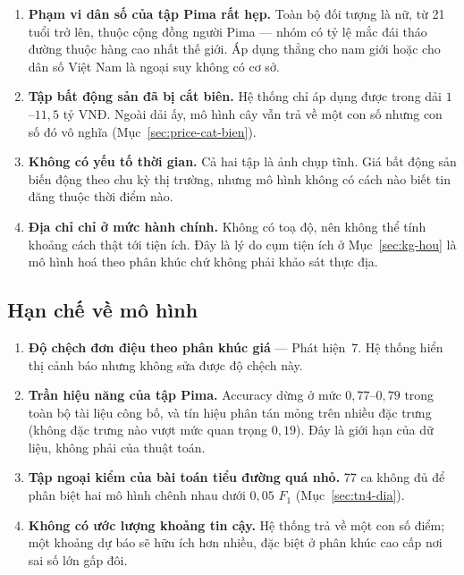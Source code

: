 \begin{enumerate}
  \item \textbf{Phạm vi dân số của tập Pima rất hẹp.} Toàn bộ đối tượng là nữ,
        từ 21 tuổi trở lên, thuộc cộng đồng người Pima --- nhóm có tỷ lệ mắc đái
        tháo đường thuộc hàng cao nhất thế giới. Áp dụng thẳng cho nam giới hoặc
        cho dân số Việt Nam là ngoại suy không có cơ sở.
  \item \textbf{Tập bất động sản đã bị cắt biên.} Hệ thống chỉ áp dụng được
        trong dải $1$--$11{,}5$ tỷ VNĐ. Ngoài dải ấy, mô hình cây vẫn trả về một
        con số nhưng con số đó vô nghĩa (Mục~\ref{sec:price-cat-bien}).
  \item \textbf{Không có yếu tố thời gian.} Cả hai tập là ảnh chụp tĩnh. Giá bất
        động sản biến động theo chu kỳ thị trường, nhưng mô hình không có cách
        nào biết tin đăng thuộc thời điểm nào.
  \item \textbf{Địa chỉ chỉ ở mức hành chính.} Không có toạ độ, nên không thể
        tính khoảng cách thật tới tiện ích. Đây là lý do cụm tiện ích ở
        Mục~\ref{sec:kg-hou} là mô hình hoá theo phân khúc chứ không phải khảo
        sát thực địa.
\end{enumerate}

\subsection{Hạn chế về mô hình}

\begin{enumerate}
  \item \textbf{Độ chệch đơn điệu theo phân khúc giá} --- Phát hiện~7. Hệ thống
        hiển thị cảnh báo nhưng không sửa được độ chệch này.
  \item \textbf{Trần hiệu năng của tập Pima.} Accuracy dừng ở mức
        $0{,}77$--$0{,}79$ trong toàn bộ tài liệu công bố, và tín hiệu phân tán
        mỏng trên nhiều đặc trưng (không đặc trưng nào vượt mức quan trọng
        $0{,}19$). Đây là giới hạn của dữ liệu, không phải của thuật toán.
  \item \textbf{Tập ngoại kiểm của bài toán tiểu đường quá nhỏ.} 77 ca không đủ
        để phân biệt hai mô hình chênh nhau dưới $0{,}05$ $F_1$
        (Mục~\ref{sec:tn4-dia}).
  \item \textbf{Không có ước lượng khoảng tin cậy.} Hệ thống trả về một con số
        điểm; một khoảng dự báo sẽ hữu ích hơn nhiều, đặc biệt ở phân khúc cao
        cấp nơi sai số lớn gấp đôi.
\end{enumerate}


